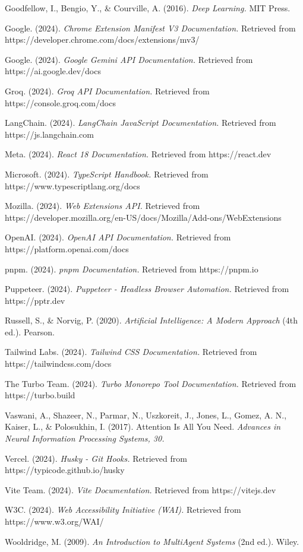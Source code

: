 \documentclass[12pt,a4paper]{article}
\begin{document}
\noindent Goodfellow, I., Bengio, Y., \& Courville, A. (2016). \textit{Deep Learning.} MIT Press.

\noindent Google. (2024). \textit{Chrome Extension Manifest V3 Documentation.} Retrieved from https://developer.chrome.com/docs/extensions/mv3/

\noindent Google. (2024). \textit{Google Gemini API Documentation.} Retrieved from https://ai.google.dev/docs

\noindent Groq. (2024). \textit{Groq API Documentation.} Retrieved from https://console.groq.com/docs

\noindent LangChain. (2024). \textit{LangChain JavaScript Documentation.} Retrieved from https://js.langchain.com

\noindent Meta. (2024). \textit{React 18 Documentation.} Retrieved from https://react.dev

\noindent Microsoft. (2024). \textit{TypeScript Handbook.} Retrieved from https://www.typescriptlang.org/docs

\noindent Mozilla. (2024). \textit{Web Extensions API.} Retrieved from https://developer.mozilla.org/en-US/docs/Mozilla/Add-ons/WebExtensions

\noindent OpenAI. (2024). \textit{OpenAI API Documentation.} Retrieved from https://platform.openai.com/docs

\noindent pnpm. (2024). \textit{pnpm Documentation.} Retrieved from https://pnpm.io

\noindent Puppeteer. (2024). \textit{Puppeteer - Headless Browser Automation.} Retrieved from https://pptr.dev

\noindent Russell, S., \& Norvig, P. (2020). \textit{Artificial Intelligence: A Modern Approach} (4th ed.). Pearson.

\noindent Tailwind Labs. (2024). \textit{Tailwind CSS Documentation.} Retrieved from https://tailwindcss.com/docs

\noindent The Turbo Team. (2024). \textit{Turbo Monorepo Tool Documentation.} Retrieved from https://turbo.build

\noindent Vaswani, A., Shazeer, N., Parmar, N., Uszkoreit, J., Jones, L., Gomez, A. N., Kaiser, L., \& Polosukhin, I. (2017). Attention Is All You Need. \textit{Advances in Neural Information Processing Systems, 30.}

\noindent Vercel. (2024). \textit{Husky - Git Hooks.} Retrieved from https://typicode.github.io/husky

\noindent Vite Team. (2024). \textit{Vite Documentation.} Retrieved from https://vitejs.dev

\noindent W3C. (2024). \textit{Web Accessibility Initiative (WAI).} Retrieved from https://www.w3.org/WAI/

\noindent Wooldridge, M. (2009). \textit{An Introduction to MultiAgent Systems} (2nd ed.). Wiley.
\end{document}
